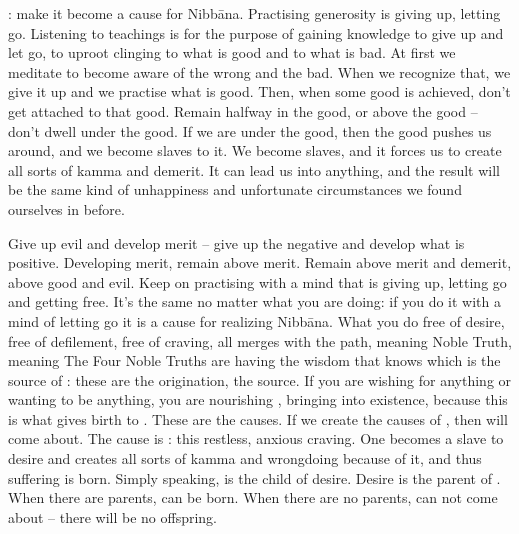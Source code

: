 : make it become a cause for Nibb\=ana. Practising generosity is giving up, letting go. Listening to teachings is for the purpose of gaining knowledge to give up and let go, to uproot clinging to what is good and to what is bad. At first we meditate to become aware of the wrong and the bad. When we recognize that, we give it up and we practise what is good. Then, when some good is achieved, don't get attached to that good. Remain halfway in the good, or above the good -- don't dwell under the good. If we are under the good, then the good pushes us around, and we become slaves to it. We become slaves, and it forces us to create all sorts of kamma and demerit. It can lead us into anything, and the result will be the same kind of unhappiness and unfortunate circumstances we found ourselves in before. 

Give up evil and develop merit -- give up the negative and develop what is positive. Developing merit, remain above merit. Remain above merit and demerit, above good and evil. Keep on practising with a mind that is giving up, letting go and getting free. It's the same no matter what you are doing: if you do it with a mind of letting go it is a cause for realizing Nibb\=ana. What you do free of desire, free of defilement, free of craving, all merges with the path, meaning Noble Truth, meaning  The Four Noble Truths are having the wisdom that knows  which is the source of    : these are the origination, the source. If you are wishing for anything or wanting to be anything, you are nourishing , bringing  into existence, because this is what gives birth to . These are the causes. If we create the causes of , then  will come about. The cause is : this restless, anxious craving. One becomes a slave to desire and creates all sorts of kamma and wrongdoing because of it, and thus suffering is born. Simply speaking,  is the child of desire. Desire is the parent of . When there are parents,  can be born. When there are no parents,  can not come about -- there will be no offspring.

